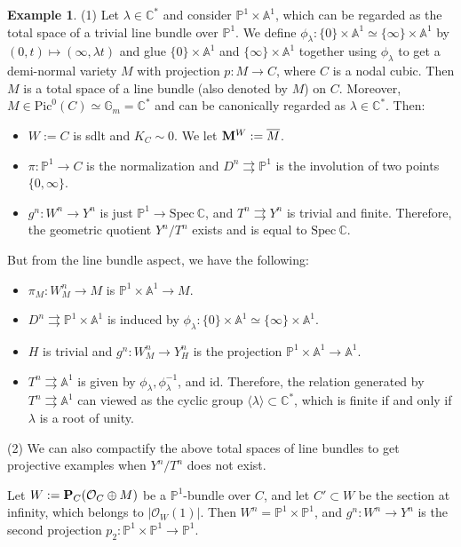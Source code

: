 \documentclass[11pt]{amsart}
\numberwithin{equation}{section}
\newcommand{\Mm}{{\bf{M}}}
\newcommand{\PP}{{\bf{P}}}
\newcommand{\Spec}{\mathrm{Spec}}
\newcommand{\id}{\mathrm{id}}
\newcommand{\Cc}{\mathbb{C}}
\newcommand{\Pp}{\mathbb{P}}
\newcommand{\Oo}{\mathcal{O}}
\newcommand{\Pic}{\mathrm{Pic}}
\theoremstyle{definition}
\theoremstyle{definition}
\newtheorem{ex}[thm]{Example}
\theoremstyle{definition}
\begin{document}
\begin{ex}\label{ex: relation is not finite in general}
  (1) Let $\lambda\in\Cc^*$ and consider $\Pp^1\times \mathbb{A}^1$,
  which can be regarded as the total space of a trivial line bundle
  over $\Pp^1$. We define $\phi_\lambda:
  \{0\}\times\mathbb{A}^1\simeq\{\infty\}\times\mathbb{A}^1$ by
  $(0,t)\mapsto(\infty,\lambda t)$ and glue $\{0\}\times\mathbb{A}^1$
  and $\{\infty\}\times\mathbb{A}^1$ together using $\phi_\lambda$ to
  get a demi-normal variety $M$ with projection $p:M\to C$, where $C$
  is a nodal cubic. Then $M$ is a total space of a line bundle (also
  denoted by $M$) on $C$. Moreover,
  $M\in\Pic^0(C)\simeq\mathbb{G}_m=\Cc^*$ and can be canonically
  regarded as $\lambda\in\Cc^*$. Then:
  \begin{itemize}
    \item $W:=C$ is sdlt and $K_C\sim 0$. We let $\Mm^W:=\overline{M}$.
    \item $\pi:\Pp^1\to C$ is the normalization and
      $D^n\rightrightarrows\Pp^1$ is the involution of two points
      $\{0,\infty\}$.
    \item $g^n: W^n\to Y^n$ is just $\Pp^1\to\Spec~\Cc$, and
      $T^n\rightrightarrows Y^n$ is trivial and finite. Therefore,
      the geometric quotient $Y^n/T^n$ exists and is equal to $\Spec~\Cc$.
  \end{itemize}
  But from the line bundle aspect, we have the following:
  \begin{itemize}
    \item $\pi_M:W^n_M\to M$ is $\Pp^1\times\mathbb{A}^1\to M$.
    \item $D^n\rightrightarrows\Pp^1\times\mathbb{A}^1$ is induced by
      $\phi_{\lambda}:\{0\}\times\mathbb{A}^1\simeq\{\infty\}\times\mathbb{A}^1$.
    \item $H$ is trivial and $g^n: W^n_M\to Y^n_H$ is the projection
      $\Pp^1\times\mathbb{A}^1\to \mathbb{A}^1$.
    \item $T^n\rightrightarrows \mathbb{A}^1$ is given by
      $\phi_\lambda,\phi^{-1}_\lambda$, and $\id$. Therefore, the
      relation generated by $T^n\rightrightarrows\mathbb{A}^1$ can
      viewed as the cyclic group $\langle\lambda\rangle\subset\Cc^*$,
      which is finite if and only if $\lambda$ is a root of unity.
  \end{itemize}
  (2) We can also compactify the above total spaces of line bundles
  to get projective examples when $Y^n/T^n$ does not exist.

  Let $W:=\PP_C(\Oo_C\oplus M)$ be a $\Pp^1$-bundle over $C$, and let
  $C'\subset W$ be the section at infinity, which belongs to
  $|\Oo_W(1)|$. Then $W^n=\Pp^1\times\Pp^1$, and $g^n:W^n\to Y^n$ is
  the second projection $p_2: \Pp^1\times\Pp^1\to\Pp^1$.


\end{ex}
\end{document}
